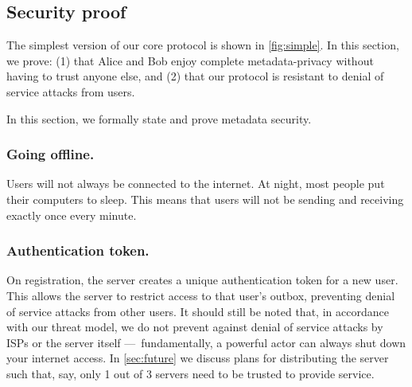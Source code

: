 \subsection{Security proof}

The simplest version of our core protocol is shown in \cref{fig:simple}. In this section, we prove: (1) that Alice and Bob enjoy complete metadata-privacy without having to trust anyone else, and (2) that our protocol is resistant to denial of service attacks from users.

In this section, we formally state and prove metadata security.


\subsubsection{Going offline.} Users will not always be connected to the internet. At night, most people put their computers to sleep. This means that users will not be sending and receiving exactly once every minute. 

\subsubsection{Authentication token.} 
On registration, the server creates a unique authentication token for a new user. This allows the server to restrict access to that user's outbox, preventing denial of service attacks from other users. It should still be noted that, in accordance with our threat model, we do not prevent against denial of service attacks by ISPs or the server itself — fundamentally, a powerful actor can always shut down your internet access. In \cref{sec:future} we discuss plans for distributing the server such that, say, only 1 out of 3 servers need to be trusted to provide service.

